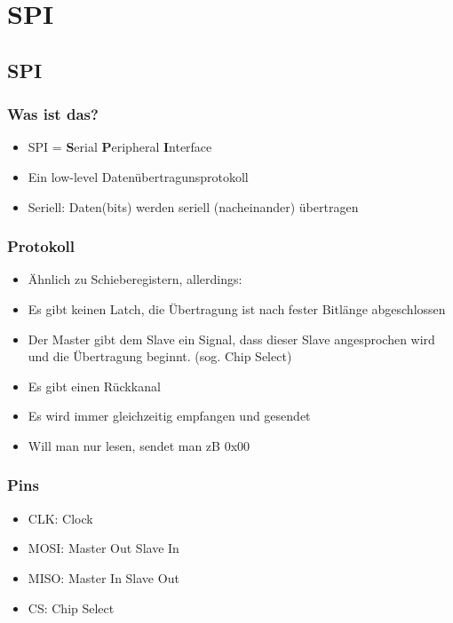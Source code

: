 \documentclass[ngerman,compress]{beamer}
\begin{document}
\section{SPI}


\subsection{SPI}

\begin{frame} [fragile]
	\frametitle{Was ist das?}
	\begin{itemize}
		\item SPI = \textbf{S}erial \textbf{P}eripheral \textbf{I}nterface
		\item Ein low-level Datenübertragunsprotokoll
		\item Seriell: Daten(bits) werden seriell (nacheinander) übertragen
	\end{itemize}
\end{frame}

\begin{frame} [fragile]
	\frametitle{Protokoll}
	\begin{itemize}
		\item Ähnlich zu Schieberegistern, allerdings:
		\item Es gibt keinen Latch, die Übertragung ist nach fester Bitlänge abgeschlossen
		\item Der Master gibt dem Slave ein Signal, dass dieser Slave angesprochen wird
			und die Übertragung beginnt. (sog. Chip Select)
		\item Es gibt einen Rückkanal
		\item Es wird immer gleichzeitig empfangen und gesendet
		\item Will man nur lesen, sendet man zB 0x00
	\end{itemize}
\end{frame}

\begin{frame} [fragile]
	\frametitle{Pins}
	\begin{itemize}
		\item CLK: Clock
		\item MOSI: Master Out Slave In
		\item MISO: Master In Slave Out
		\item CS: Chip Select
	\end{itemize}
\end{frame}

\end{document}
